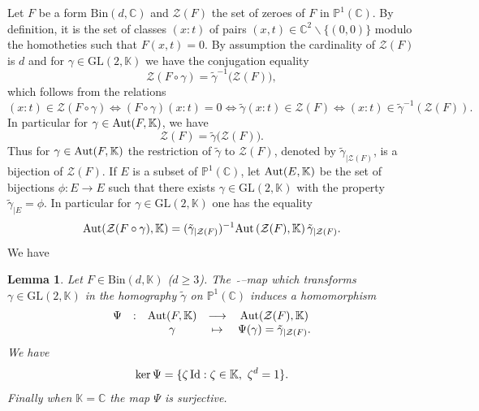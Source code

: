 \documentclass[10pt]{article}
\newtheorem{lemma}[theorem]{Lemma}
\theoremstyle{definition}
\numberwithin{equation}{section}
\newcommand {\C}{{\mathbb{C}}}
\newcommand {\PP}{{\mathbb{P}}}
\newcommand {\K}{{\mathbb{K}}}
\newcommand{\Bin}{\mathrm {Bin}}
\newcommand{\GL}{\mathrm {GL}}
\begin{document}
Let $F$ be a form $\Bin  (d,\C)$ and ${\mathcal Z}(F)$ the set of zeroes of $F$ in $\PP^1 (\C)$. By definition, it is the set of classes $(x:t)$ 
of pairs $(x,t)\in \C^2\smallsetminus \{(0,0)\}$ modulo the homotheties such that $F(x,t) =0$. By assumption the cardinality of ${\mathcal Z} (F)$ is $d$ and for $\gamma\in {\GL}(2, \K)$ we have the conjugation equality 
\begin{equation}\label{Z (fcircgamma)}
\mathcal Z (F\circ \gamma) = \tilde \gamma^{-1} \bigl( \mathcal Z (F)\bigr),
\end{equation} 
which follows from the relations 
\[
(x:t) \in {\mathcal Z} (F\circ \gamma)
\iff
\left( F\circ \gamma\right) (x:t)=0 \iff \tilde \gamma (x:t) \in {\mathcal Z} (F)
\iff (x:t) \in \tilde \gamma^{-1}\left( {\mathcal Z}(F)\right).
\]
In particular for $\gamma \in {\rm Aut} (F,\K)$, we have 
\begin{equation}\label{281}
\mathcal Z (F) =\tilde \gamma \bigl( \mathcal Z (F)).
\end{equation}
Thus for $\gamma\in {\rm Aut} (F,\K)$ the restriction of $\tilde \gamma$ to $\mathcal Z (F)$, denoted by $\tilde \gamma_{\vert \mathcal Z (F)}$, is a bijection of $\mathcal Z (F)$. If $E$ is a subset of $\mathbb P^1 (\C)$, 
let ${\rm Aut}( E, \K)$ be the set of bijections $\phi : E\rightarrow E$ such that there exists $\gamma \in {\GL} (2,\K)$ 
with the property $\tilde \gamma_{\vert E} = \phi$. In particular for $\gamma \in {\GL}(2, \K)$ one has the equality 
\begin{equation*}
{\rm Aut} (\mathcal Z (F\circ \gamma), \K) = (\tilde \gamma_{\vert \mathcal Z(F)})^{-1} {\rm Aut } \left( \mathcal Z (F), \K\right) \tilde \gamma_{\vert \mathcal Z (F)}.
\end{equation*}
 We have 
 
\begin{lemma} \label{278}
Let $F \in \Bin (d, \K)$ ($d\geqslant 3$). The \, $\tilde{}$--map
 which transforms $\gamma\in {\GL}(2, \K)$ in the homography $\tilde \gamma$ on $\PP^1 (\C)$ induces a homomorphism 
 \[
\begin{matrix}
\Psi & : &{\rm Aut} (F, \K) &\longrightarrow & {\rm Aut} (\mathcal Z (F), \K)\\
& & \gamma& \mapsto &\Psi (\gamma) = \tilde \gamma_{\vert \mathcal Z (F)}.
\end{matrix}
\]
We have 
\[
 \ker \Psi =\{ \zeta\, {\rm Id}: \zeta \in \K, \ \zeta^d =1\}.
 \]
 Finally when $\K =\C$ the map $\Psi $ is surjective.

\end{lemma}
 
\end{document}
